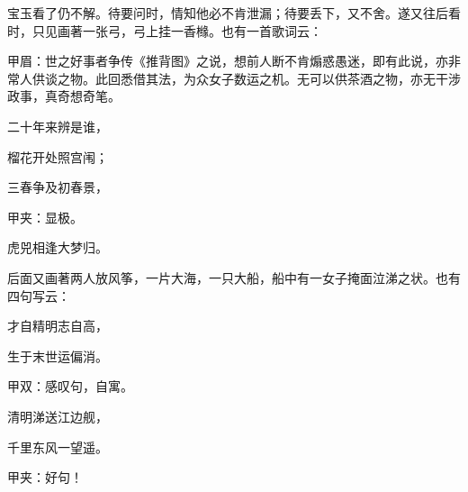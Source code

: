 \begin{parag}
    宝玉看了仍不解。待要问时，情知他必不肯泄漏；待要丢下，又不舍。遂又往后看时，只见画著一张弓，弓上挂一香橼。也有一首歌词云：\begin{note}甲眉：世之好事者争传《推背图》之说，想前人断不肯煽惑愚迷，即有此说，亦非常人供谈之物。此回悉借其法，为众女子数运之机。无可以供茶酒之物，亦无干涉政事，真奇想奇笔。\end{note}
\end{parag}


\begin{poem}
    \begin{pl}二十年来辨是谁，\end{pl}

    \begin{pl}榴花开处照宫闱；\end{pl}

    \begin{pl}三春争及初春景，\end{pl}\begin{note}甲夹：显极。\end{note}

    \begin{pl}虎兕相逢大梦归。\end{pl}
\end{poem}

\begin{parag}
    后面又画著两人放风筝，一片大海，一只大船，船中有一女子掩面泣涕之状。也有四句写云：
\end{parag}


\begin{poem}
    \begin{pl}才自精明志自高，\end{pl}

    \begin{pl}生于末世运偏消。\end{pl}\begin{note}甲双：感叹句，自寓。\end{note}

    \begin{pl}清明涕送江边舰，\end{pl}

    \begin{pl}千里东风一望遥。\end{pl}\begin{note}甲夹：好句！\end{note}
\end{poem}

